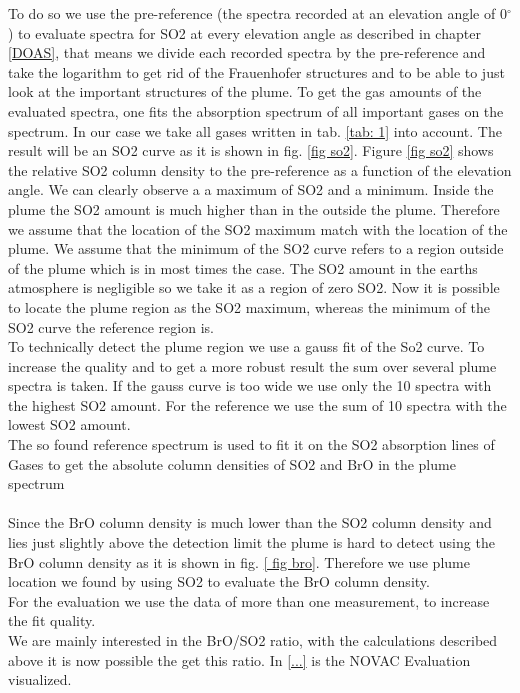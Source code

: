 \documentclass  [
  paper    = a4,
  BCOR     = 10mm,
  twoside,
  fontsize = 12pt,
  fleqn,
  toc      = bibnumbered,
  toc      = listofnumbered,
  numbers  = noendperiod,
  headings = normal,
  listof   = leveldown,
  version  = 3.03
]                                       {scrreprt}
\begin{document}
	To do so we use the pre-reference (the spectra recorded at an elevation angle of  0$^{\circ} $) to evaluate spectra for SO2 at every elevation angle as described in chapter \ref{DOAS}, that means we divide each recorded spectra by the pre-reference and take the logarithm  to get rid of the Frauenhofer structures and to be able to just look at the important structures of the plume. To get the gas amounts of the evaluated spectra, one fits the absorption spectrum of all important gases on the spectrum. In our case we take all gases written in tab. \ref{tab: 1} into account. The result will be an SO2 curve as it is shown in fig. \ref{fig so2}.
	Figure \ref{fig so2} shows the relative SO2 column density to the pre-reference as a function of the elevation angle. We can clearly observe a a maximum of SO2 and a minimum. Inside the plume the SO2 amount is much higher than in the outside the plume. Therefore we assume that the location of the SO2 maximum match with the location of the plume. We assume that the minimum of the SO2 curve refers to a region outside of the plume which is in most times the case. The SO2 amount in the earths atmosphere is negligible so we take it as a region of zero SO2. Now it is possible to locate the plume region as the SO2 maximum, whereas the minimum of the SO2 curve the reference region is. \\
	To technically detect the plume region we use a gauss fit of the So2 curve.
	To increase the quality and to get a more robust result the sum over several plume spectra is taken. If the gauss curve is too wide we use only the 10 spectra with the highest SO2 amount. For the reference we use the sum of 10 spectra with the lowest SO2 amount.\\
	The so found reference spectrum is used to fit it on the SO2 absorption lines of Gases to get the absolute column densities of SO2 and BrO in the plume spectrum\\
	\\
	Since the BrO column density is much lower than the SO2 column density and lies just slightly above the detection limit the plume is hard to detect using the BrO column density as it is shown in fig. \ref{ fig bro}. 
	Therefore we use plume location we found by using SO2 to evaluate the BrO column density.\\
	For the evaluation we use the data of more than one measurement, to increase the fit quality.\\
	We are mainly interested in the BrO/SO2 ratio, with the calculations described above it is now possible the get this ratio.
	In \cref{...} is the NOVAC Evaluation visualized.
	
\end{document}
